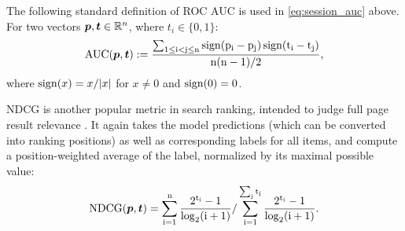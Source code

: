 The following standard definition of ROC AUC is used in \eqref{eq:session_auc} above. For two vectors $\boldsymbol{p}, \boldsymbol{t} \in \mathbb{R}^n$, where $t_i \in \{0, 1\}$:
\begin{align*}
\rm{AUC}(\boldsymbol{p}, \boldsymbol{t}) := \frac{\sum_{1 \leq i < j \leq n} \operatorname{sign}(p_i - p_j) \operatorname{sign}(t_i - t_j)}{n(n-1) / 2},
\end{align*}
where $\operatorname{sign}(x) = x / |x|$ for $x \neq 0$ and $\operatorname{sign}(0) = 0$.


NDCG is another popular metric in search ranking, intended to judge full page result relevance \cite{distinguishability2013theoretical}. It again takes the model predictions (which can be converted into ranking positions) as well as corresponding labels for all items, and compute a position-weighted average of the label, normalized by its maximal possible value:
\begin{align*}
    \rm{NDCG}(\boldsymbol{p}, \boldsymbol{t}) = \sum_{i=1}^n \frac{2^{t_i} - 1}{\log_2(i + 1)} / \sum_{i=1}^{\sum_j t_j} \frac{2^{t_i} - 1}{\log_2(i + 1)}.
\end{align*}


